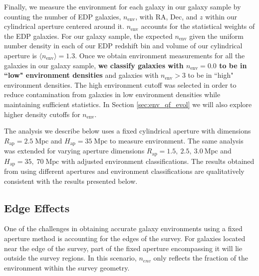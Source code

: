 \documentclass{emulateapj}
\def \apradius{2.5}
\def \apheight{35}
\begin{document}
Finally, we measure the environment for each galaxy in our galaxy
sample by counting the number of EDP galaxies, $n_{\mathrm{env}}$, with RA,
Dec, and $z$ within our cylindrical aperture centered around
it. $n_{\mathrm{env}}$ accounts for the statistical weights of the EDP
galaxies. 
For our galaxy sample, the expected $n_{\mathrm{env}}$ given the uniform number density in 
each of our EDP redshift bin and volume of our cylindrical aperture is $\langle n_{\mathrm{env}} \rangle = 1.3$. 
Once we obtain environment measurements for all the galaxies
in our galaxy sample, {\bf we classify galaxies with $n_{\mathrm{env}} = 0.0$
to be in ``low" environment densities} and galaxies with $n_{\mathrm{env}} > 3$
to be in ``high" environment densities. The high environment cutoff was
selected in order to reduce contamination from galaxies in low
environment densities while maintaining sufficient statistics. In
Section \ref{sec:env_qf_evol} we will also explore higher density
cutoffs for $n_{\mathrm{env}}$.

The analysis we describe below uses a fixed cylindrical aperture with
dimensions $R_{\mathrm{ap}} = \apradius \; \mathrm{Mpc}$ and $H_{\mathrm{ap}} = \apheight
\;\mathrm{Mpc}$ to measure environment. The same analysis was
extended for varying aperture dimensions $R_{\mathrm{ap}} = 1.5, \: \apradius, \:3.0 \:
\mathrm{Mpc}$ and $H_{\mathrm{ap}} = \apheight, \; 70 \;\mathrm{Mpc}$ with adjusted environment classifications. 
The results obtained from using different apertures and
environment classifications are qualitatively consistent with the results presented below.  

\subsection{Edge Effects} \label{sec:edgeeffect}
One of the challenges in obtaining accurate galaxy environments using a fixed aperture method is accounting for the edges of the survey. For galaxies located near the edge of the survey, part of the fixed aperture encompassing it will lie outside the survey regions. In this scenario, $n_{env}$ only reflects the fraction of the environment within the survey geometry.
\end{document}
